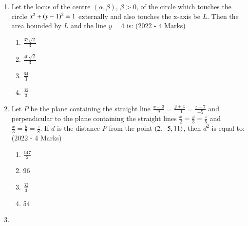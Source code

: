 \documentclass[journal]{IEEEtran}
\begin{document}
\begin{enumerate}
{        }
 \item{
    	
	    	Let the locus of the centre $(\alpha, \beta)$, $\beta > 0$, of the circle which touches the circle $x^2 + \left(y - 1\right)^2 = 1$ externally and also touches the x-axis be $L$. Then the area bounded by $L$ and the line $y = 4$ is:
	    	\text{   }\hfill
	    	{(2022 - 4 Marks)}
	    	\begin{multicols}{4}
	    		\begin{enumerate}
	    			\item $\frac{32\sqrt{2}}{3}$
	    			\item $\frac{40\sqrt{2}}{3}$
	    			\item $\frac{64}{3}$
	    			\item $\frac{32}{3}$
	    		\end{enumerate}
	    	\end{multicols}
	    	
	    }
    \item{
	
		    Let $P$ be the plane containing the straight line $\frac{x-3}{9}=\frac{y+4}{-1}=\frac{z-7}{-5}$ and perpendicular to the plane containing the straight lines $\frac{x}{2}=\frac{y}{3}=\frac{z}{5}$ and $\frac{x}{3}=\frac{y}{7}=\frac{z}{8}.$ If $d$ is the distance $P$ from the point $\left(2, -5, 11\right)$, then $d^2$ is equal to:
			\text{   }\hfill
			{(2022 - 4 Marks)}
			\begin{multicols}{4}
				\begin{enumerate}
						\item $\frac{147}{2}$
						\item 96
						\item $\frac{32}{3}$
						\item 54
				\end{enumerate}
			\end{multicols}
			
		}

    \item{
        
}
\end{enumerate}
\end{document}
